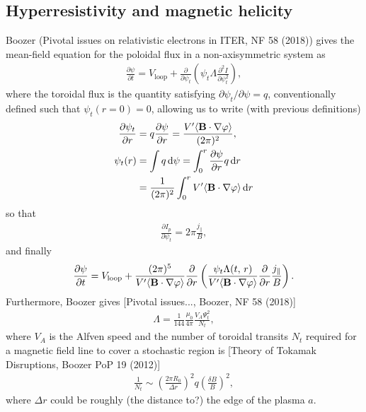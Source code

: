 \documentclass[11pt,a4paper]{article}
\newcommand{\rd}{\ensuremath{\mathrm{d}}}
\newcommand{\sub}[1]{\ensuremath{_{\text{#1}}}}
\renewcommand{\b}[1]{\ensuremath{ {\bf #1 } }}
\begin{document}
\subsection{Hyperresistivity and magnetic helicity}
Boozer (Pivotal issues on relativistic electrons in ITER, NF 58 (2018)) gives the mean-field equation for the poloidal flux in a non-axisymmetric system as
\begin{align}
\frac{\partial \psi}{\partial t} = V\sub{loop} + \frac{\partial}{\partial \psi_t}\left(\psi_t \Lambda \frac{\partial^2 I}{\partial \psi_t^2}\right),
\end{align}
where the toroidal flux is the quantity satisfying $\partial \psi_t/\partial \psi = q$, conventionally defined such that $\psi_t(r=0) = 0$, allowing us to write (with previous definitions) 
\begin{align}
\frac{\partial \psi_t}{\partial r} &= q\frac{\partial \psi}{\partial r} = \frac{V'\langle \b{B}\cdot\nabla\varphi \rangle}{(2\pi)^2}, \nonumber \\
\psi_t(r) &= \int q \,\rd \psi = \int_0^r \frac{\partial \psi}{\partial r}q\,\rd r \nonumber \\
&= \frac{1}{(2\pi)^2} \int_0^r V'\langle \b{B}\cdot\nabla\varphi\rangle\,\rd r
\end{align}
so that
\begin{align}
\frac{\partial I_p}{\partial \psi_t} = 2\pi \frac{j_\parallel}{B},
\end{align}
and finally 
\begin{align}
\frac{\partial \psi}{\partial t} = V\sub{loop} + \frac{(2\pi)^5}{ V'\langle \b{B}\cdot\nabla\varphi\rangle}\frac{\partial}{\partial r}\left( \frac{\psi_t\Lambda(t,\,r)}{V'\langle \b{B}\cdot\nabla\varphi\rangle}  \frac{\partial}{\partial r}\frac{j_\parallel}{B}\right).
\end{align}
Furthermore, Boozer gives [Pivotal issues..., Boozer, NF 58 (2018)]
\begin{align}
\Lambda = \frac{1}{144} \frac{\mu_0}{4\pi}\frac{V_A \Psi_t^2}{N_t},
\end{align}
where $V_A$ is the Alfven speed and the number of toroidal transits $N_t$ required for a magnetic field line to cover a stochastic region is [Theory of Tokamak Disruptions, Boozer PoP 19 (2012)]
\begin{align}
\frac{1}{N_t} \sim \left(\frac{2\pi R_0}{\Delta r}\right)^2 q \left(\frac{\delta B}{B}\right)^2,
\end{align}
where $\Delta r$ could be roughly (the distance to?) the edge of the plasma $a$.
\end{document}
